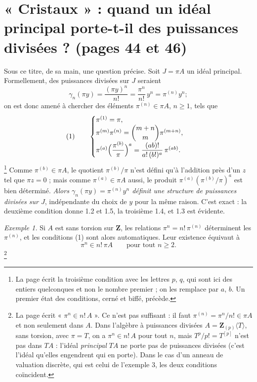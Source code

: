 \documentclass[11pt,a4paper]{article}
\begin{document}
\section*{« Cristaux » : quand un idéal principal porte-t-il des puissances divisées ? (pages 44 et 46)}

Sous ce titre, de sa main, une question précise. Soit $J = \pi A$ un idéal
principal. Formellement, des puissances divisées sur $J$ seraient
\[
\gamma_n(\pi y) = \frac{(\pi y)^{n}}{n!} = \frac{\pi^{n}}{n!}\, y^{n} =
\pi^{(n)} y^{n} ;
\]
on est donc amené à chercher des éléments $\pi^{(n)} \in \pi A$, $n
\geqslant 1$, tels que
\[
(1) \qquad
\begin{cases}
\pi^{(1)} = \pi, \\
\pi^{(m)}\pi^{(n)} = \dbinom{m+n}{m}\pi^{(m+n)}, \\
\pi^{(a)}\Bigl(\dfrac{\pi^{(b)}}{\pi}\Bigr)^{a} = \dfrac{(ab)!}{a!\,(b!)^{a}}\,
\pi^{(ab)} .
\end{cases}
\]
\footnote{La page écrit la troisième condition avec les lettres $p$, $q$,
qui sont ici des entiers quelconques et non le nombre premier ; on les
remplace par $a$, $b$. Un premier état des conditions, cerné et biffé,
précède.} Comme $\pi^{(b)} \in \pi A$, le quotient $\pi^{(b)}/\pi$ n'est
défini qu'à l'addition près d'un $z$ tel que $\pi z = 0$ ; mais comme
$\pi^{(a)} \in \pi A$ aussi, le produit $\pi^{(a)}(\pi^{(b)}/\pi)^{a}$ est
bien déterminé. \emph{Alors $\gamma_n(\pi y) = \pi^{(n)}y^{n}$ définit une
structure de puissances divisées sur $J$}, indépendante du choix de $y$ pour
la même raison. C'est exact : la deuxième condition donne 1.2 et 1.5, la
troisième 1.4, et 1.3 est évidente.

\emph{Exemple 1.} Si $A$ est sans torsion sur $\mathbf{Z}$, les relations
$\pi^{n} = n!\,\pi^{(n)}$ déterminent les $\pi^{(n)}$, et les conditions (1)
sont alors automatiques. Leur existence équivaut à
\[
\pi^{n} \in n!\,\pi A \qquad \text{pour tout } n \geqslant 2 .
\]
\footnote{La page écrit « $\pi^{n} \in n!\,A$ ». Ce n'est pas suffisant : il
faut $\pi^{(n)} = \pi^{n}/n! \in \pi A$ et non seulement dans $A$. Dans
l'algèbre à puissances divisées $A = \mathbf{Z}_{(p)}\langle T \rangle$,
sans torsion, avec $\pi = T$, on a $\pi^{n} \in n!\,A$ pour tout $n$, mais
$T^{p}/p! = T^{[p]}$ n'est pas dans $TA$ : l'idéal \emph{principal} $TA$ ne
porte pas de puissances divisées (c'est l'idéal qu'elles engendrent qui en
porte). Dans le cas d'un anneau de valuation discrète, qui est celui de
l'exemple 3, les deux conditions coïncident.}
\end{document}
